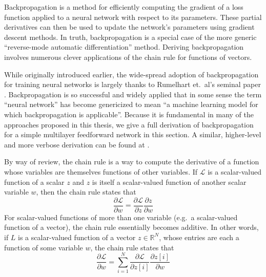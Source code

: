 Backpropagation is a method for efficiently computing the gradient of a loss function applied to a neural network with respect to its parameters.
These partial derivatives can then be used to update the network's parameters using gradient descent methods.
In truth, backpropagation is a special case of the more generic ``reverse-mode automatic differentiation'' method.
Deriving backpropagation involves numerous clever applications of the chain rule for functions of vectors.

While originally introduced earlier, the wide-spread adoption of backpropagation for training neural networks is largely thanks to Rumelhart et.\ al's seminal paper \cite{rumelhart1986learning}.
Backpropagation is so successful and widely applied that in some sense the term ``neural network'' has become genericized to mean ``a machine learning model for which backpropagation is applicable''.
Because it is fundamental in many of the approaches proposed in this thesis, we give a full derivation of backpropagation for a simple multilayer feedforward network in this section.
A similar, higher-level and more verbose derivation can be found at \cite{nielsen2015neural}.

By way of review, the chain rule is a way to compute the derivative of a function whose variables are themselves functions of other variables.
If $\mathcal{L}$ is a scalar-valued function of a scalar $z$ and $z$ is itself a scalar-valued function of another scalar variable $w$, then the chain rule states that
\begin{equation}
\frac{\partial \mathcal{L}}{\partial w} = \frac{\partial \mathcal{L}}{\partial z}\frac{\partial z}{\partial w}
\end{equation}
For scalar-valued functions of more than one variable (e.g.\ a scalar-valued function of a vector), the chain rule essentially becomes additive.
In other words, if $L$ is a scalar-valued function of a vector $z \in \mathbb{R}^N$, whose entries are each a function of some variable $w$, the chain rule states that
\begin{equation}
\frac{\partial \mathcal{L}}{\partial w} = \sum_{i = 1}^N \frac{\partial \mathcal{L}}{\partial z[i]}\frac{\partial z[i]}{\partial w}
\end{equation}

